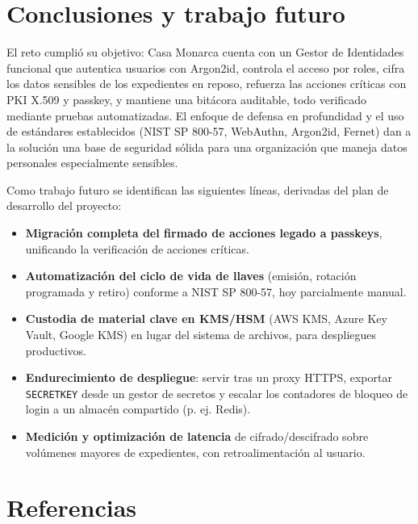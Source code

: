 \documentclass[10pt,letterpaper]{report}
\renewcommand{\_}{\textunderscore\allowbreak}
\begin{document}
\chapter{Conclusiones y trabajo futuro}

El reto cumpli\'o su objetivo: Casa Monarca cuenta con un
Gestor de Identidades funcional que autentica usuarios con Argon2id, controla el
acceso por roles, cifra los datos sensibles de los expedientes en reposo, refuerza
las acciones cr\'iticas con PKI X.509 y passkey, y mantiene una bit\'acora
auditable, todo verificado mediante pruebas automatizadas. El enfoque de defensa
en profundidad y el uso de est\'andares establecidos (NIST SP 800-57, WebAuthn,
Argon2id, Fernet) dan a la soluci\'on una base de seguridad s\'olida para una
organizaci\'on que maneja datos personales especialmente sensibles.

Como trabajo futuro se identifican las siguientes l\'ineas, derivadas del plan de
desarrollo del proyecto:

\begin{itemize}[leftmargin=1.4em]
  \item \textbf{Migraci\'on completa del firmado de acciones legado a passkeys},
  unificando la verificaci\'on de acciones cr\'iticas.
  \item \textbf{Automatizaci\'on del ciclo de vida de llaves} (emisi\'on, rotaci\'on
  programada y retiro) conforme a NIST SP 800-57, hoy parcialmente manual.
  \item \textbf{Custodia de material clave en KMS/HSM} (AWS KMS, Azure Key Vault,
  Google KMS) en lugar del sistema de archivos, para despliegues productivos.
  \item \textbf{Endurecimiento de despliegue}: servir tras un proxy HTTPS,
  exportar \texttt{SECRET\_KEY} desde un gestor de secretos y escalar los
  contadores de bloqueo de login a un almac\'en compartido (p. ej. Redis).
  \item \textbf{Medici\'on y optimizaci\'on de latencia} de cifrado/descifrado
  sobre vol\'umenes mayores de expedientes, con retroalimentaci\'on al usuario.
\end{itemize}

\chapter*{Referencias}
\end{document}
